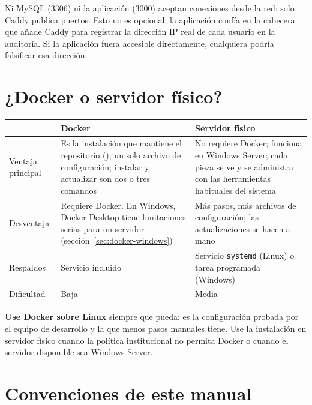 Ni MySQL (3306) ni la aplicación (3000) aceptan conexiones desde la red: solo Caddy publica
puertos. Esto no es opcional; la aplicación confía en la cabecera  que
añade Caddy para registrar la dirección IP real de cada usuario en la auditoría. Si la
aplicación fuera accesible directamente, cualquiera podría falsificar esa dirección.

\section{¿Docker o servidor físico?}

\begin{xltabular}{\linewidth}{@{}l L L@{}}
	\toprule
	& \textbf{Docker} & \textbf{Servidor físico} \\
	\midrule
	\endhead
	Ventaja principal & Es la instalación que mantiene el repositorio
	(); un solo archivo de configuración; instalar y actualizar son dos o tres
	comandos &
	No requiere Docker; funciona en Windows Server; cada pieza se ve y se administra con
	las herramientas habituales del sistema \\
	Desventaja & Requiere Docker. En Windows, Docker Desktop tiene limitaciones serias para
	un servidor (sección~\ref{sec:docker-windows}) & Más pasos, más archivos de configuración;
	las actualizaciones se hacen a mano \\
	Respaldos & Servicio  incluido & Servicio \texttt{systemd} (Linux) o
	tarea programada (Windows) \\
	Dificultad & Baja & Media \\
	\bottomrule
\end{xltabular}

\begin{nota}[Recomendación]
	\textbf{Use Docker sobre Linux} siempre que pueda: es la configuración probada por el equipo de
	desarrollo y la que menos pasos manuales tiene. Use la instalación en servidor físico cuando la
	política institucional no permita Docker o cuando el servidor disponible sea Windows Server.
\end{nota}

\section{Convenciones de este manual}

